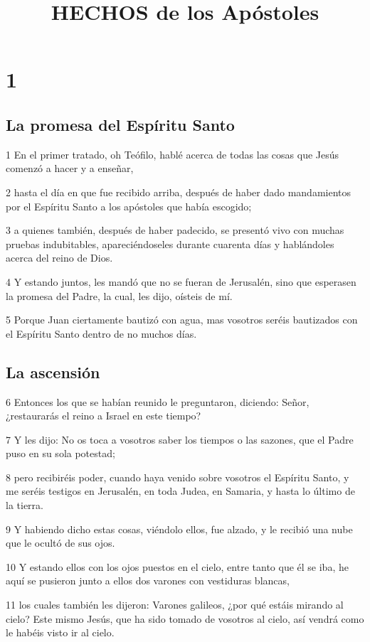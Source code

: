
\title{HECHOS de los Apóstoles}

\chapter{1}

\section*{La promesa del Espíritu Santo}

\par 1 En el primer tratado, oh Teófilo, hablé acerca de todas las cosas que Jesús comenzó a hacer y a enseñar,
\par 2 hasta el día en que fue recibido arriba, después de haber dado mandamientos por el Espíritu Santo a los apóstoles que había escogido;
\par 3 a quienes también, después de haber padecido, se presentó vivo con muchas pruebas indubitables, apareciéndoseles durante cuarenta días y hablándoles acerca del reino de Dios.
\par 4 Y estando juntos, les mandó que no se fueran de Jerusalén, sino que esperasen la promesa del Padre, la cual, les dijo, oísteis de mí.
\par 5 Porque Juan ciertamente bautizó con agua, mas vosotros seréis bautizados con el Espíritu Santo dentro de no muchos días.

\section*{La ascensión}

\par 6 Entonces los que se habían reunido le preguntaron, diciendo: Señor, ¿restaurarás el reino a Israel en este tiempo?
\par 7 Y les dijo: No os toca a vosotros saber los tiempos o las sazones, que el Padre puso en su sola potestad;
\par 8 pero recibiréis poder, cuando haya venido sobre vosotros el Espíritu Santo, y me seréis testigos en Jerusalén, en toda Judea, en Samaria, y hasta lo último de la tierra.
\par 9 Y habiendo dicho estas cosas, viéndolo ellos, fue alzado, y le recibió una nube que le ocultó de sus ojos.
\par 10 Y estando ellos con los ojos puestos en el cielo, entre tanto que él se iba, he aquí se pusieron junto a ellos dos varones con vestiduras blancas,
\par 11 los cuales también les dijeron: Varones galileos, ¿por qué estáis mirando al cielo? Este mismo Jesús, que ha sido tomado de vosotros al cielo, así vendrá como le habéis visto ir al cielo.

